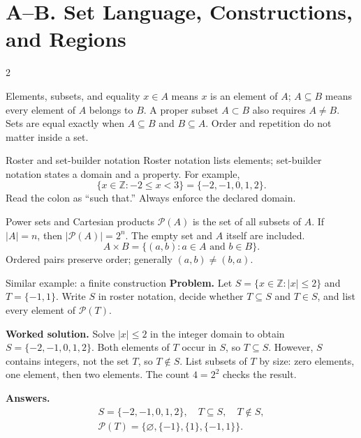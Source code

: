 \documentclass[10pt]{article}
\begin{document}
\small

\section*{A--B. Set Language, Constructions, and Regions}
\begin{multicols}{2}
\begin{definitionbox}{Elements, subsets, and equality}
$x\in A$ means $x$ is an element of $A$; $A\subseteq B$ means every element
of $A$ belongs to $B$. A proper subset $A\subset B$ also requires $A\ne B$.
Sets are equal exactly when $A\subseteq B$ and $B\subseteq A$. Order and
repetition do not matter inside a set.
\end{definitionbox}

\begin{definitionbox}{Roster and set-builder notation}
Roster notation lists elements; set-builder notation states a domain and a
property. For example,
\[
\{x\in\mathbb Z:-2\le x<3\}=\{-2,-1,0,1,2\}.
\]
Read the colon as ``such that.'' Always enforce the declared domain.
\end{definitionbox}

\begin{definitionbox}{Power sets and Cartesian products}
$\mathcal P(A)$ is the set of all subsets of $A$. If $|A|=n$, then
$|\mathcal P(A)|=2^n$. The empty set and $A$ itself are included.
\[
A\times B=\{(a,b):a\in A\text{ and }b\in B\}.
\]
Ordered pairs preserve order; generally $(a,b)\ne(b,a)$.
\end{definitionbox}

\begin{workedbox}{Similar example: a finite construction}
\textbf{Problem.} Let $S=\{x\in\mathbb Z:|x|\le2\}$ and $T=\{-1,1\}$.
Write $S$ in roster notation, decide whether $T\subseteq S$ and $T\in S$,
and list every element of $\mathcal P(T)$.

\textbf{Worked solution.} Solve $|x|\le2$ in the integer domain to obtain
$S=\{-2,-1,0,1,2\}$. Both elements of $T$ occur in $S$, so $T\subseteq S$.
However, $S$ contains integers, not the set $T$, so $T\notin S$. List subsets
of $T$ by size: zero elements, one element, then two elements. The count
$4=2^2$ checks the result.

\textbf{Answers.}
\[
\begin{gathered}
S=\{-2,-1,0,1,2\},\quad T\subseteq S,\quad T\notin S,\\
\mathcal P(T)=\{\varnothing,\{-1\},\{1\},\{-1,1\}\}.
\end{gathered}
\]
\end{workedbox}



\end{multicols}
\end{document}
